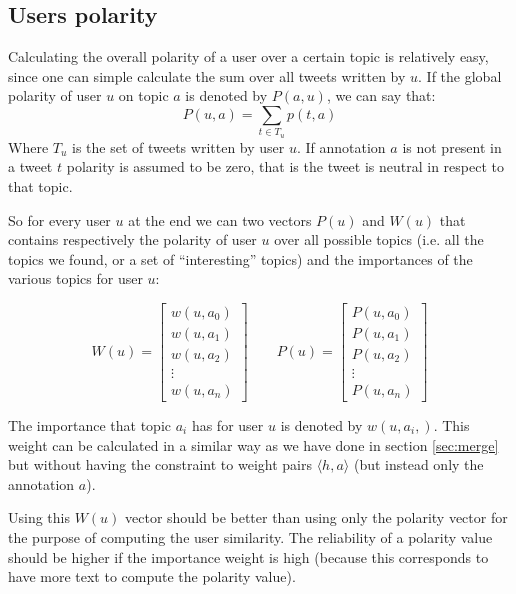 \documentclass[a4paper,11pt,oneside]{article}
\begin{document}
\subsection{Users polarity}
Calculating the overall polarity of a user over a certain topic is relatively easy, since one can simple calculate the sum over all tweets written by $u$. If the global polarity of user $u$ on topic $a$ is denoted by $P(a,u)$, we can say that: %
\begin{equation}
P(u,a) = \sum_{t \in T_u} p(t,a) %
\end{equation}
Where $T_u$ is the set of tweets written by user $u$. If annotation $a$ is not present in a tweet $t$ polarity is assumed to be zero, that is the tweet is neutral in respect to that topic.

So for every user $u$ at the end we can two vectors $P(u)$ and $W(u)$ that contains respectively the polarity of user $u$ over all possible topics (i.e. all the topics we found, or a set of ``interesting'' topics) and the importances of the various topics for user $u$:

\begin{equation}
W(u) = \left[  \begin{array}{c}
w(u,a_0) \\ 
w(u,a_1) \\ 
w(u,a_2) \\ 
\vdots \\ 
w(u,a_n)
\end{array}\right]\qquad
P(u) = \left[  \begin{array}{c}
P(u,a_0) \\ 
P(u,a_1) \\ 
P(u,a_2) \\ 
\vdots \\ 
P(u,a_n)
\end{array}\right]
\end{equation}

The importance that topic $a_i$ has for user $u$ is denoted by $w(u,a_i,)$. This weight can be calculated in a similar way as we have done in section \ref{sec:merge} but without having the constraint to weight pairs $\langle h,a \rangle$ (but instead only the annotation $a$).

Using this $W(u)$ vector should be better than using only the polarity vector for the purpose of computing the user similarity. The reliability of a polarity value should be higher if the importance weight is high (because this corresponds to have more text to compute the polarity value).
\end{document}
